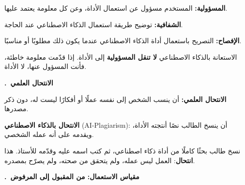 \documentclass[a4paper]{article}
\newcounter{qism}
\newcommand{\qism}[1]{%
    \stepcounter{qism}%
    \par\bigskip
    {\large\khatt\bfseries{\color{asasi}\arabic{qism}.}\ {\color{dakin}#1}}\par
    \vspace{-2pt}{\color{black!20}\rule{\linewidth}{0.6pt}}\par\nopagebreak[4]
    \smallskip}
\newcommand{\kalima}[2][]{\textbf{#2}}
\begin{document}
\begin{taarif}
\textbf{المسؤولية:} المستخدم مسؤول عن استعمال الأداة، وعن كل معلومة يعتمد عليها.

\textbf{الشفافية:} توضيح طريقة استعمال الذكاء الاصطناعي عند الحاجة.

\textbf{الإفصاح:} التصريح باستعمال أداة الذكاء الاصطناعي عندما يكون ذلك مطلوبًا أو مناسبًا.
\end{taarif}

\begin{intabih}
الاستعانة بالذكاء الاصطناعي \textbf{لا تنقل المسؤولية} إلى الأداة.
إذا قدّمت معلومة خاطئة، فأنت المسؤول عنها، لا الأداة.
\end{intabih}

\qism{الانتحال العلمي}

\begin{taarif}
\textbf{الانتحال العلمي:} أن ينسب الشخص إلى نفسه عملًا أو أفكارًا ليست له،
دون ذكر مصدرها.

\textbf{الانتحال بالذكاء الاصطناعي} \textenglish{(AI-Plagiarism)}:
أن ينسخ الطالب نصًا أنتجته الأداة، ويقدمه على أنه عمله الشخصي.
\end{taarif}

\begin{mithal}[حالة]
نسخ طالب بحثًا كاملًا من أداة ذكاء اصطناعي، ثم كتب اسمه عليه وقدّمه للأستاذ.
هذا \kalima[ahmar]{انتحال}: العمل ليس عمله، ولم يتحقق من صحته، ولم يصرّح بمصدره.
\end{mithal}

\qism{مقياس الاستعمال: من المقبول إلى المرفوض}

\begin{center}
\end{center}
\end{document}
